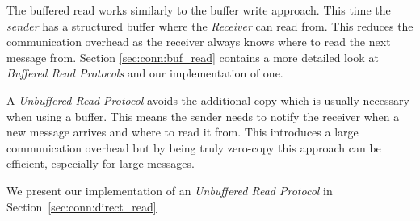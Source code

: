 The buffered read works similarly to the buffer write approach. This time the \emph{sender} has a structured buffer where the 
\emph{Receiver} can read from. This reduces the communication overhead as the receiver always knows where to read the next 
message from. Section \ref{sec:conn:buf_read} contains a more detailed look at \emph{Buffered Read Protocols} and our 
implementation of one.

A \emph{Unbuffered Read Protocol} avoids the additional copy which is usually necessary when using a buffer. This means the 
sender needs to notify the receiver when a new message arrives and where to read it from.  This introduces a large
communication overhead but by being truly zero-copy this approach can be efficient, especially for large messages.

We present our implementation of an \emph{Unbuffered Read Protocol} in Section~\ref{sec:conn:direct_read}




